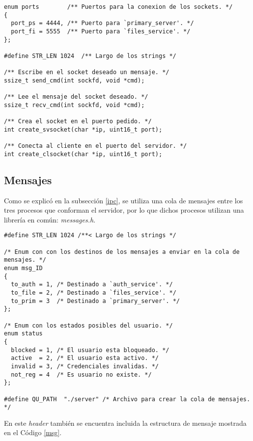 \documentclass[12pt,a4paper]{article}
\begin{document}
\begin{lstlisting}[caption={\emph{Header} para el uso de \emph{sockets}.}, label={socket}, language=Ce]
enum ports        /** Puertos para la conexion de los sockets. */
{
  port_ps = 4444, /** Puerto para `primary_server'. */
  port_fi = 5555  /** Puerto para `files_service'. */
};

#define STR_LEN 1024  /** Largo de los strings */

/** Escribe en el socket deseado un mensaje. */
ssize_t send_cmd(int sockfd, void *cmd);

/** Lee el mensaje del socket deseado. */
ssize_t recv_cmd(int sockfd, void *cmd);

/** Crea el socket en el puerto pedido. */
int create_svsocket(char *ip, uint16_t port);

/** Conecta al cliente en el puerto del servidor. */
int create_clsocket(char *ip, uint16_t port);
\end{lstlisting}

\subsection{Mensajes}
\label{msg_h}
Como se explicó en la subsección \ref{ipc}, se utiliza una cola de mensajes
entre los tres procesos que conforman el servidor, por lo que dichos procesos
utilizan una librería en común: \emph{messages.h}.

\begin{lstlisting}[caption={\emph{Header} para el uso de la cola de mensajes.}, label={msgql}, language=Ce]
#define STR_LEN 1024 /**< Largo de los strings */

/* Enum con con los destinos de los mensajes a enviar en la cola de mensajes. */
enum msg_ID
{
  to_auth = 1, /* Destinado a `auth_service'. */
  to_file = 2, /* Destinado a `files_service'. */
  to_prim = 3  /* Destinado a `primary_server'. */
};

/* Enum con los estados posibles del usuario. */
enum status
{
  blocked = 1, /* El usuario esta bloqueado. */
  active  = 2, /* El usuario esta activo. */
  invalid = 3, /* Credenciales invalidas. */
  not_reg = 4  /* Es usuario no existe. */
};

#define QU_PATH  "./server" /* Archivo para crear la cola de mensajes. */
\end{lstlisting}

En este \emph{header} también se encuentra incluida la estructura de mensaje
mostrada en el Código \ref{msg}.
\end{document}

